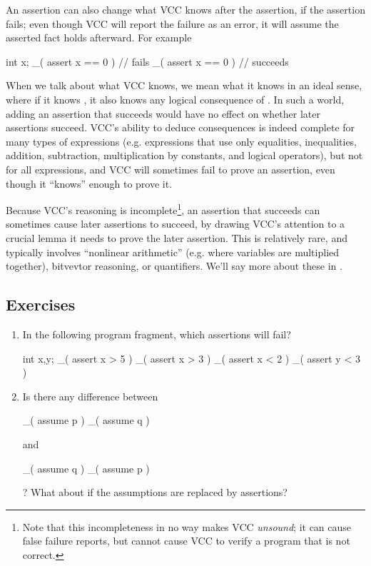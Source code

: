 An assertion can also change what VCC knows after the assertion, if
the assertion fails; even though VCC will report the failure as an error,
it will assume the asserted fact holds afterward. For example
\begin{VCC}
int x;
_( assert x == 0 ) // fails
_( assert x == 0 ) // succeeds
\end{VCC}

When we talk about what VCC knows, we mean what it knows in an ideal
sense, where if it knows , it also knows any logical
consequence of . In such a world, adding an assertion that
succeeds would have no effect on whether later assertions succeed.
VCC's ability to deduce consequences is indeed complete for many types
of expressions (e.g. expressions that use only equalities,
inequalities, addition, subtraction, multiplication by constants, and
logical operators), but not for all expressions, and VCC will
sometimes fail to prove an assertion, even though it ``knows'' enough
to prove it.  

Because VCC's reasoning is incomplete\footnote{Note that this
  incompleteness in no way makes VCC \emph{unsound}; it can cause
  false failure reports, but cannot cause VCC to verify a program that
  is not correct.}, an assertion that succeeds can sometimes cause
later assertions to succeed, by drawing VCC's attention to a crucial
lemma it needs to prove the later assertion.  This is relatively rare,
and typically involves ``nonlinear arithmetic'' (e.g. where variables
are multiplied together), bitvevtor reasoning, or quantifiers. We'll
say more about these in .

\subsection{Exercises}
\begin{enumerate}
\item
In the following program fragment, which assertions will fail?
\begin{VCC}
int x,y; 
_( assert x > 5 ) 
_( assert x > 3 ) 
_( assert x < 2 ) 
_( assert y < 3 )
\end{VCC}
\item
Is there any difference between 
\begin{VCC}
_( assume p ) _( assume q  )
\end{VCC}
and 
\begin{VCC}
_( assume q ) _( assume p )
\end{VCC}
? What about if the assumptions are replaced by assertions?
\end{enumerate}



